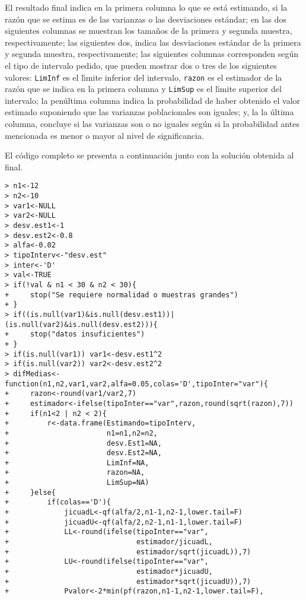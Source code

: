\begin{solucion}
 \par 
 El resultado final indica en la primera columna lo que se est\'a estimando, si la raz\'on que se estima es de las varianzas o las desviaciones est\'andar; en las dos siguientes columnas se muestran los tama\~nos de la primera y segunda muestra, respectivamente; las siguientes dos, indica las desviaciones est\'andar de la primera y segunda muestra, respectivamente; las siguientes columnas corresponden seg\'un el tipo de intervalo pedido, que pueden mostrar dos o tres de los siguientes valores: \texttt{LimInf} es el l\'{\i}mite inferior del intervalo, \texttt{razon} es el estimador de la raz\'on que se indica en la primera columna y \texttt{LimSup} es el l\'{\i}mite superior del intervalo; la pen\'ultima columna indica la probabilidad de haber obtenido el valor estimado suponiendo que las varianzas poblacionales son iguales; y, la la \'ultima columna, concluye si las varianzas son o no iguales seg\'un si la probabilidad antes mencionada es menor o mayor al nivel de significancia.
 \par
 El c\'odigo completo se presenta a continuaci\'on junto con la soluci\'on obtenida al final.
 \begin{verbatim}
> n1<-12
> n2<-10
> var1<-NULL
> var2<-NULL
> desv.est1<-1
> desv.est2<-0.8
> alfa<-0.02
> tipoInterv<-"desv.est"
> inter<-'D'
> val<-TRUE
> if(!val & n1 < 30 & n2 < 30){
+     stop("Se requiere normalidad o muestras grandes")
+ }
> if((is.null(var1)&is.null(desv.est1))|(is.null(var2)&is.null(desv.est2))){
+     stop("datos insuficientes")
+ }
> if(is.null(var1)) var1<-desv.est1^2
> if(is.null(var2)) var2<-desv.est2^2
> difMedias<-function(n1,n2,var1,var2,alfa=0.05,colas='D',tipoInter="var"){
+     razon<-round(var1/var2,7)
+     estimador<-ifelse(tipoInter=="var",razon,round(sqrt(razon),7))
+     if(n1<2 | n2 < 2){
+         r<-data.frame(Estimando=tipoInterv,
+                       n1=n1,n2=n2,
+                       desv.Est1=NA,
+                       desv.Est2=NA,
+                       LimInf=NA,
+                       razon=NA,
+                       LimSup=NA)
+     }else{
+         if(colas=='D'){
+             jicuadL<-qf(alfa/2,n1-1,n2-1,lower.tail=F)
+             jicuadU<-qf(alfa/2,n2-1,n1-1,lower.tail=F)
+             LL<-round(ifelse(tipoInter=="var",
+                              estimador/jicuadL,
+                              estimador/sqrt(jicuadL)),7)
+             LU<-round(ifelse(tipoInter=="var",
+                              estimador*jicuadU,
+                              estimador*sqrt(jicuadU)),7)
+             Pvalor<-2*min(pf(razon,n1-1,n2-1,lower.tail=F),

\end{verbatim}
\end{solucion}
